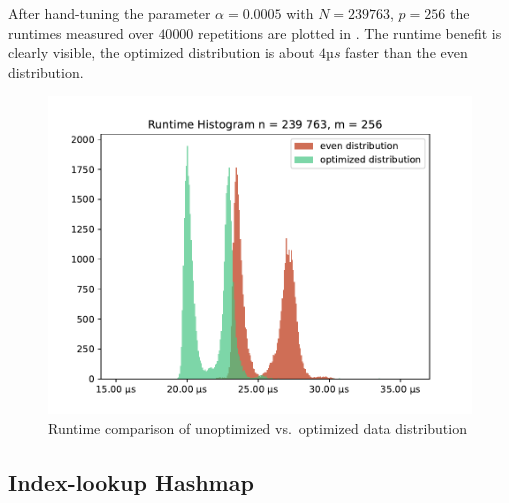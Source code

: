 After hand-tuning the parameter $\alpha = 0.0005$ with $N = 239 763$, $p = 256$ the runtimes measured over $40 000$ repetitions are plotted in .
The runtime benefit is clearly visible, the optimized distribution is about $4µs$ faster than the even distribution.

\begin{figure}
\centering
\includegraphics[scale=0.75]{figures/distribution_experiment}
\caption{Runtime comparison of unoptimized vs.\ optimized data distribution}
\label{fig:distribution_runtimes}
\end{figure}


\subsection{Index-lookup Hashmap}
\label{sec:IndexLookupHashmap}

